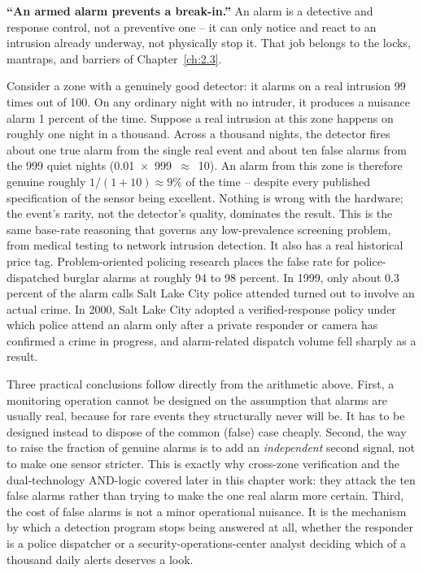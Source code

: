 \begin{misconception}
\textbf{``An armed alarm prevents a break-in.''} An alarm is a detective and response control, not
a preventive one -- it can only notice and react to an intrusion already underway, not physically
stop it. That job belongs to the locks, mantraps, and barriers of Chapter~\ref{ch:2.3}.
\end{misconception}

\begin{example}
Consider a zone with a genuinely good detector: it alarms on a real intrusion 99 times out of 100.
On any ordinary night with no intruder, it produces a nuisance alarm 1 percent of the time.
Suppose a real intrusion at this zone happens on roughly one night in a thousand. Across a
thousand nights, the detector fires about one true alarm from the single real event and about ten
false alarms from the 999 quiet nights (0.01~$\times$~999~$\approx$~10). An alarm from this zone is
therefore genuine roughly $1/(1+10) \approx 9\%$ of the time -- despite every published
specification of the sensor being excellent. Nothing is wrong with the hardware; the event's
rarity, not the detector's quality, dominates the result. This is the same base-rate reasoning that
governs any low-prevalence screening problem, from medical testing to network intrusion detection.
It also has a real historical price tag. Problem-oriented policing research places the false rate
for police-dispatched burglar alarms at roughly 94 to 98 percent. In 1999, only about 0.3 percent
of the alarm calls Salt Lake City police attended turned out to involve an actual
crime. In 2000, Salt Lake City adopted a verified-response
policy under which police attend an alarm only after a private responder or camera has confirmed a
crime in progress, and alarm-related dispatch volume fell sharply as a result.
\end{example}

Three practical conclusions follow directly from the arithmetic above. First, a monitoring
operation cannot be designed on the assumption that alarms are usually real, because for rare
events they structurally never will be. It has to be designed instead to dispose of the common (false)
case cheaply. Second, the way to raise the fraction of genuine alarms is to add an
\emph{independent} second signal, not to make one sensor stricter. This is exactly why cross-zone
verification and the dual-technology AND-logic covered later in this chapter work: they attack the
ten false alarms rather than trying to make the one real alarm more certain. Third, the cost of
false alarms is not a minor operational nuisance. It is the mechanism by which a detection program
stops being answered at all, whether the responder is a police dispatcher or a
security-operations-center analyst deciding which of a thousand daily alerts deserves a look.

